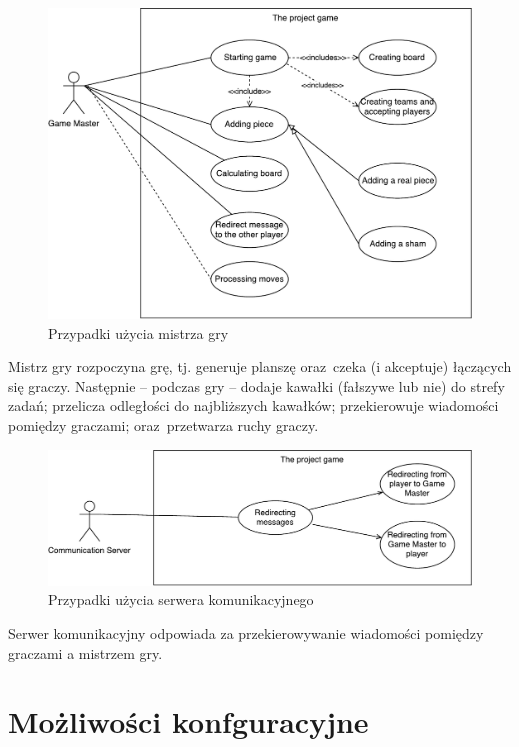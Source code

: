 \documentclass[a4paper]{article}
\begin{document}
\begin{figure}[H]
\caption{Przypadki użycia mistrza gry}
\centering
\includegraphics[scale=0.7]{przypadki_uzycia_gm.pdf}
\end{figure}

Mistrz gry rozpoczyna grę, tj. generuje planszę oraz~czeka (i akceptuje) łączących się graczy.
Następnie -- podczas gry -- dodaje kawałki (fałszywe lub nie) do strefy zadań; przelicza odległości do najbliższych kawałków; przekierowuje wiadomości pomiędzy graczami; oraz~przetwarza ruchy graczy.

\begin{figure}[H]
\caption{Przypadki użycia serwera komunikacyjnego}
\centering
\includegraphics[scale=0.7]{przypadki_uzycia_cs.pdf}
\end{figure}

Serwer komunikacyjny odpowiada za przekierowywanie wiadomości pomiędzy graczami a mistrzem gry.

\section{Możliwości konfguracyjne}

\end{document}
